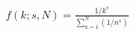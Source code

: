 \documentclass[preview]{standalone}
\begin{document}
\begin{align*}
{\displaystyle f(k;s,N)={\frac {1/k^{s}}{\sum \limits _{n=1}^{N}(1/n^{s})}}}
\end{align*}
\end{document}
